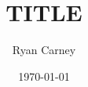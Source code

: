 \documentclass[11pt,two side, letterpaper]{article}
\author{Ryan Carney}
\title{TITLE}
\date{\today}
\begin{document}
\maketitle
\section*{}
\end{document}

